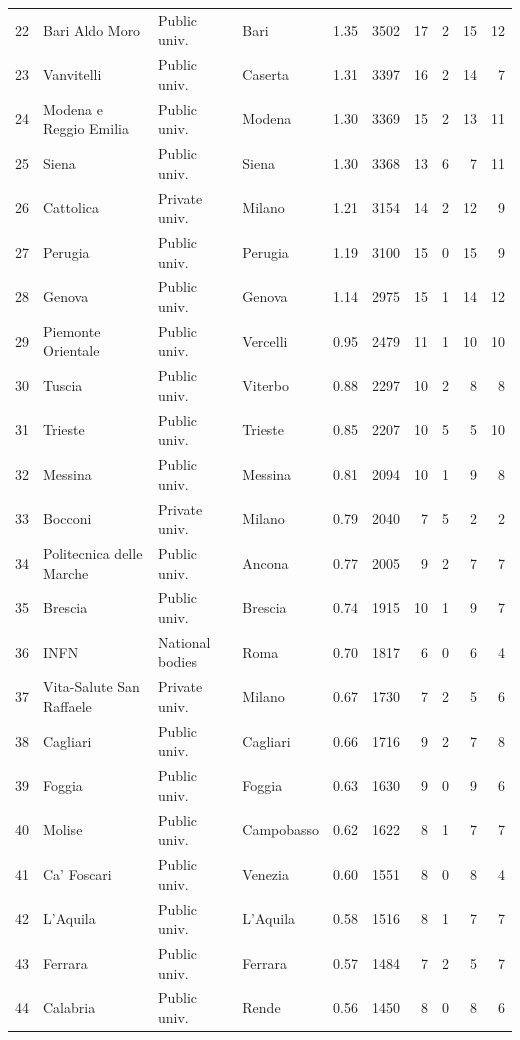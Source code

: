 \documentclass[11pt,a4paper]{article}
\begin{document}
{\begin{longtable}{rlllrrrrrr}
22 & Bari Aldo Moro & Public univ. & Bari & 1.35 & 3502 & 17 & 2 & 15 & 12 \\
23 & Vanvitelli & Public univ. & Caserta & 1.31 & 3397 & 16 & 2 & 14 & 7 \\
24 & Modena e Reggio Emilia & Public univ. & Modena & 1.30 & 3369 & 15 & 2 & 13 & 11 \\
25 & Siena & Public univ. & Siena & 1.30 & 3368 & 13 & 6 & 7 & 11 \\
26 & Cattolica & Private univ. & Milano & 1.21 & 3154 & 14 & 2 & 12 & 9 \\
27 & Perugia & Public univ. & Perugia & 1.19 & 3100 & 15 & 0 & 15 & 9 \\
28 & Genova & Public univ. & Genova & 1.14 & 2975 & 15 & 1 & 14 & 12 \\
29 & Piemonte Orientale & Public univ. & Vercelli & 0.95 & 2479 & 11 & 1 & 10 & 10 \\
30 & Tuscia & Public univ. & Viterbo & 0.88 & 2297 & 10 & 2 & 8 & 8 \\
31 & Trieste & Public univ. & Trieste & 0.85 & 2207 & 10 & 5 & 5 & 10 \\
32 & Messina & Public univ. & Messina & 0.81 & 2094 & 10 & 1 & 9 & 8 \\
33 & Bocconi & Private univ. & Milano & 0.79 & 2040 & 7 & 5 & 2 & 2 \\
34 & Politecnica delle Marche & Public univ. & Ancona & 0.77 & 2005 & 9 & 2 & 7 & 7 \\
35 & Brescia & Public univ. & Brescia & 0.74 & 1915 & 10 & 1 & 9 & 7 \\
36 & INFN & National bodies & Roma & 0.70 & 1817 & 6 & 0 & 6 & 4 \\
37 & Vita-Salute San Raffaele & Private univ. & Milano & 0.67 & 1730 & 7 & 2 & 5 & 6 \\
38 & Cagliari & Public univ. & Cagliari & 0.66 & 1716 & 9 & 2 & 7 & 8 \\
39 & Foggia & Public univ. & Foggia & 0.63 & 1630 & 9 & 0 & 9 & 6 \\
40 & Molise & Public univ. & Campobasso & 0.62 & 1622 & 8 & 1 & 7 & 7 \\
41 & Ca' Foscari & Public univ. & Venezia & 0.60 & 1551 & 8 & 0 & 8 & 4 \\
42 & L'Aquila & Public univ. & L'Aquila & 0.58 & 1516 & 8 & 1 & 7 & 7 \\
43 & Ferrara & Public univ. & Ferrara & 0.57 & 1484 & 7 & 2 & 5 & 7 \\
44 & Calabria & Public univ. & Rende & 0.56 & 1450 & 8 & 0 & 8 & 6 \\

\end{longtable}}
\end{document}
